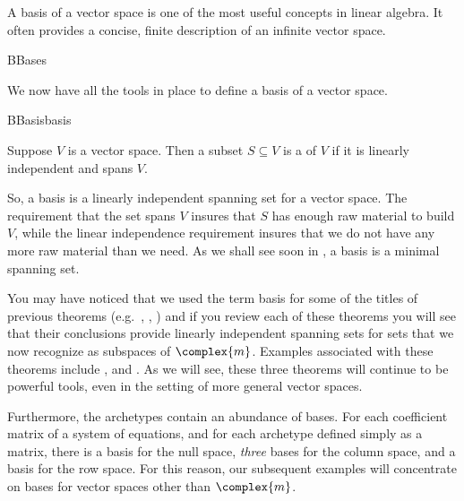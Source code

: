 %
\begin{introduction}
\begin{para}A basis of a vector space is one of the most useful concepts in linear algebra.  It often provides a concise, finite description of an infinite vector space.\end{para}
\end{introduction}
%
\begin{subsect}{B}{Bases}
%
\begin{para}We now have all the tools in place to define a basis of a vector space.\end{para}
%
\begin{definition}{B}{Basis}{basis}
\begin{para}Suppose $V$ is a vector space.  Then a subset $S\subseteq V$ is a  of $V$ if it is linearly independent and spans $V$.\end{para}
\end{definition}
%
\begin{para}So, a basis is a linearly independent spanning set for a vector space.  The requirement that the set spans $V$ insures that $S$ has enough raw material to build $V$, while the linear independence requirement insures that we do not have any more raw material than we need.  As we shall see soon in , a basis is a minimal spanning set.\end{para}
%
\begin{para}You may have noticed that we used the term basis for some of the titles of previous theorems (e.g.\ , , ) and if you review each of these theorems you will see that their conclusions provide linearly independent spanning sets for sets that we now recognize as subspaces of $\complex{m}$.  Examples associated with these theorems include ,  and .  As we will see, these three theorems will continue to be powerful tools, even in the setting of more general vector spaces.\end{para}
%
\begin{para}Furthermore, the archetypes contain an abundance of bases.  For each coefficient matrix of a system of equations, and for each archetype defined simply as a matrix, there is a basis for the null space, {\em three} bases for the column space, and a basis for the row space.  For this reason, our subsequent examples will concentrate on bases for vector spaces other than $\complex{m}$.\end{para}

\end{subsect}

